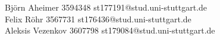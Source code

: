 
\renewcommand{\theenumi}{(\alph{enumi})}
\renewcommand{\labelenumi}{\text{\theenumi}}


\newcommand{\exercise}[1]{\section*{Aufgabe \theexnum\stepcounter{exnum}: #1}}

\newcommand{\mbeq}{\overset{!}{=}}
\newcommand{\probgets}{\overset{\$}{\gets}}

\renewcommand{\autodot}{}
\renewcommand{\thesubsection}{(\alph{subsection})}

\renewcommand{\theenumi}{\textbf{\arabic{enumi}.}}

\newenvironment{proposition}[1][]{\par\noindent\textit{Proposition}\ifx&#1&\else\ (#1)\fi. }

\ohead{
    Bj\"orn Aheimer 3594348 st177191@stud.uni-stuttgart.de \\ 
    Felix R\"ohr 3567731 st176436@stud.uni-stuttgart.de \\
    Aleksis Vezenkov 3607798 st179084@stud.uni-stuttgart.de}
    
